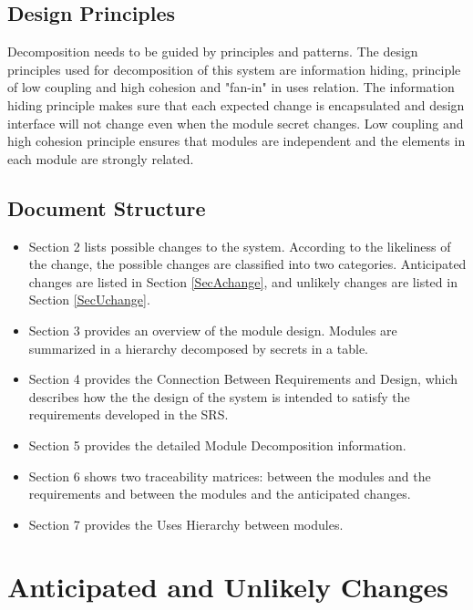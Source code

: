 \documentclass[12pt, titlepage]{article}
\begin{document}
\subsection{Design Principles}

Decomposition needs to be guided by principles and patterns. The design principles used for decomposition of this system are information hiding, principle of low coupling and high cohesion and "fan-in" in uses relation.
The information hiding principle makes sure that each expected change is encapsulated and design interface will not change even when the module secret changes. Low coupling and high cohesion principle ensures that modules are independent and the elements in each module are strongly related.

\subsection{Document Structure}

\begin{itemize}

\item Section 2 lists possible changes to the system. According to the likeliness of the change, the possible changes are classified into two categories. Anticipated changes are listed in Section \ref{SecAchange}, and unlikely changes are listed in Section \ref{SecUchange}.

\item Section 3 provides an overview of the module design. Modules are summarized in a hierarchy decomposed by secrets in a table.

\item Section 4 provides the Connection Between Requirements and Design, which describes how the the design of the system is intended to satisfy the requirements developed in the SRS.

\item Section 5 provides the detailed Module Decomposition information. 

\item Section 6 shows two traceability matrices: between the modules and the requirements and between the modules and the anticipated changes.

\item Section 7 provides the Uses Hierarchy between modules.

\end{itemize}	

\section{Anticipated and Unlikely Changes} \label{SecChange}
\end{document}
